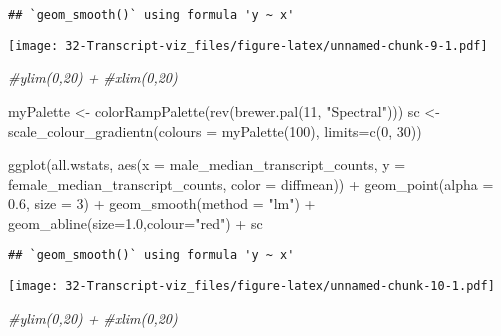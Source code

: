 \documentclass[
]{article}
\newenvironment{Shaded}{\begin{snugshade}}{\end{snugshade}}
\newcommand{\AttributeTok}[1]{\textcolor[rgb]{0.77,0.63,0.00}{#1}}
\newcommand{\CommentTok}[1]{\textcolor[rgb]{0.56,0.35,0.01}{\textit{#1}}}
\newcommand{\DecValTok}[1]{\textcolor[rgb]{0.00,0.00,0.81}{#1}}
\newcommand{\FloatTok}[1]{\textcolor[rgb]{0.00,0.00,0.81}{#1}}
\newcommand{\FunctionTok}[1]{\textcolor[rgb]{0.00,0.00,0.00}{#1}}
\newcommand{\NormalTok}[1]{#1}
\newcommand{\OtherTok}[1]{\textcolor[rgb]{0.56,0.35,0.01}{#1}}
\newcommand{\SpecialCharTok}[1]{\textcolor[rgb]{0.00,0.00,0.00}{#1}}
\newcommand{\StringTok}[1]{\textcolor[rgb]{0.31,0.60,0.02}{#1}}
\begin{document}
\begin{verbatim}
## `geom_smooth()` using formula 'y ~ x'
\end{verbatim}

\texttt{[image: 32-Transcript-viz\_files/figure-latex/unnamed-chunk-9-1.pdf]}

\begin{Shaded}
\begin{Highlighting}[]
  \CommentTok{\#ylim(0,20) +}
  \CommentTok{\#xlim(0,20)}
\end{Highlighting}
\end{Shaded}

\begin{Shaded}
\begin{Highlighting}[]
\NormalTok{myPalette }\OtherTok{\textless{}{-}} \FunctionTok{colorRampPalette}\NormalTok{(}\FunctionTok{rev}\NormalTok{(}\FunctionTok{brewer.pal}\NormalTok{(}\DecValTok{11}\NormalTok{, }\StringTok{"Spectral"}\NormalTok{)))}
\NormalTok{sc }\OtherTok{\textless{}{-}} \FunctionTok{scale\_colour\_gradientn}\NormalTok{(}\AttributeTok{colours =} \FunctionTok{myPalette}\NormalTok{(}\DecValTok{100}\NormalTok{), }\AttributeTok{limits=}\FunctionTok{c}\NormalTok{(}\DecValTok{0}\NormalTok{, }\DecValTok{30}\NormalTok{))}

\FunctionTok{ggplot}\NormalTok{(all.wstats, }\FunctionTok{aes}\NormalTok{(}\AttributeTok{x =}\NormalTok{ male\_median\_transcript\_counts, }\AttributeTok{y =}\NormalTok{ female\_median\_transcript\_counts, }\AttributeTok{color =}\NormalTok{ diffmean)) }\SpecialCharTok{+}
  \FunctionTok{geom\_point}\NormalTok{(}\AttributeTok{alpha =} \FloatTok{0.6}\NormalTok{, }\AttributeTok{size =} \DecValTok{3}\NormalTok{) }\SpecialCharTok{+}
  \FunctionTok{geom\_smooth}\NormalTok{(}\AttributeTok{method =} \StringTok{"lm"}\NormalTok{) }\SpecialCharTok{+}
  \FunctionTok{geom\_abline}\NormalTok{(}\AttributeTok{size=}\FloatTok{1.0}\NormalTok{,}\AttributeTok{colour=}\StringTok{"red"}\NormalTok{) }\SpecialCharTok{+}
\NormalTok{  sc }
\end{Highlighting}
\end{Shaded}

\begin{verbatim}
## `geom_smooth()` using formula 'y ~ x'
\end{verbatim}

\texttt{[image: 32-Transcript-viz\_files/figure-latex/unnamed-chunk-10-1.pdf]}

\begin{Shaded}
\begin{Highlighting}[]
  \CommentTok{\#ylim(0,20) +}
  \CommentTok{\#xlim(0,20)}
\end{Highlighting}
\end{Shaded}
\end{document}
